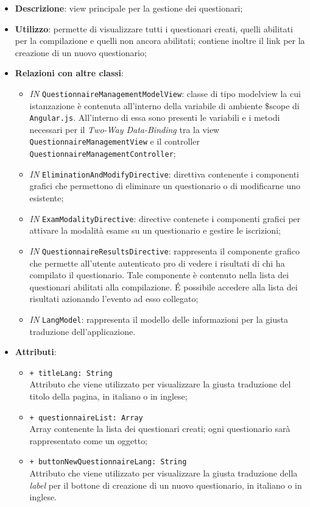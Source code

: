 \begin{itemize}
	\item \textbf{Descrizione}: view principale per la gestione dei questionari;
	\item \textbf{Utilizzo}: permette di visualizzare tutti i questionari creati, quelli abilitati per la compilazione e quelli non ancora abilitati; contiene inoltre il link per la creazione di un nuovo questionario;
	\item \textbf{Relazioni con altre classi}:
	\begin{itemize}
		\item \textit{IN} \texttt{QuestionnaireManagementModelView}: classe di tipo modelview la cui istanzazione è contenuta all'interno della variabile di ambiente \$scope di \texttt{Angular.js}. All'interno di essa sono presenti le variabili e i metodi necessari per il \textit{Two-Way Data-Binding} tra la view \texttt{QuestionnaireManagementView} e il controller \texttt{QuestionnaireManagementController};
		\item \textit{IN} \texttt{EliminationAndModifyDirective}: direttiva contenente i componenti grafici  che permettono di eliminare un questionario o di modificarne uno esistente;
		\item \textit{IN} \texttt{ExamModalityDirective}: directive contenete i componenti grafici per attivare la modalità esame su un questionario e gestire le iscrizioni;
		\item \textit{IN} \texttt{QuestionnaireResultsDirective}: rappresenta il componente grafico che permette all'utente autenticato pro di vedere i risultati di chi ha compilato il questionario. Tale componente è contenuto nella lista dei questionari abilitati alla compilazione. \'E possibile accedere alla lista dei risultati azionando l'evento ad esso collegato;
		\item \textit{IN} \texttt{LangModel}: rappresenta il modello delle informazioni per la giusta traduzione dell'applicazione.
	\end{itemize}
		\item \textbf{Attributi}:
		\begin{itemize}
			\item \texttt{+ titleLang: String} \\ Attributo che viene utilizzato per visualizzare la giusta traduzione del titolo della pagina, in italiano o in inglese;
			\item \texttt{+ questionnaireList: Array} \\ Array contenente la lista dei questionari creati; ogni questionario sarà rappresentato come un oggetto;
			\item \texttt{+ buttonNewQuestionnaireLang: String} \\ Attributo che viene utilizzato per visualizzare la giusta traduzione della \textit{label} per il bottone di creazione di un nuovo questionario, in italiano o in inglese.
		\end{itemize}
\end{itemize}


